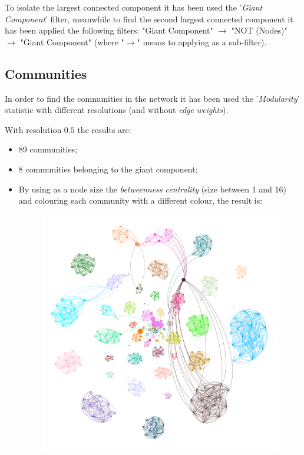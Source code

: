 \documentclass{article}
\begin{document}
        \noindent To isolate the largest connected component it has been used the '\textit{Giant Component}' filter, meanwhile to find the second largest connected component it has been applied the following filters: "Giant Component" \(\to\) "NOT (Nodes)" \(\to\) "Giant Component" (where "\(\to\)" means to applying as a sub-filter).
        
        \subsection{Communities}
        In order to find the communities in the network it has been used the '\textit{Modularity}' statistic  with different resolutions (and without \textit{edge weights}).\newline
        
        \par\noindent With resolution \(0.5\) the results are:
        \begin{itemize}
            \item 89 communities;
            \item 8 communities belonging to the giant component;
            \item By using as a node size the \textit{betweenness centrality} (size between 1 and 16) and colouring each community with a different colour, the result is:
            \begin{figure}[H]
                \centering
             \includegraphics[width=1\textwidth]{3.1.png}
                \caption{}
                \label{fig:figure-3.1}
            \end{figure}
            
        \end{itemize}
        
\end{document}

